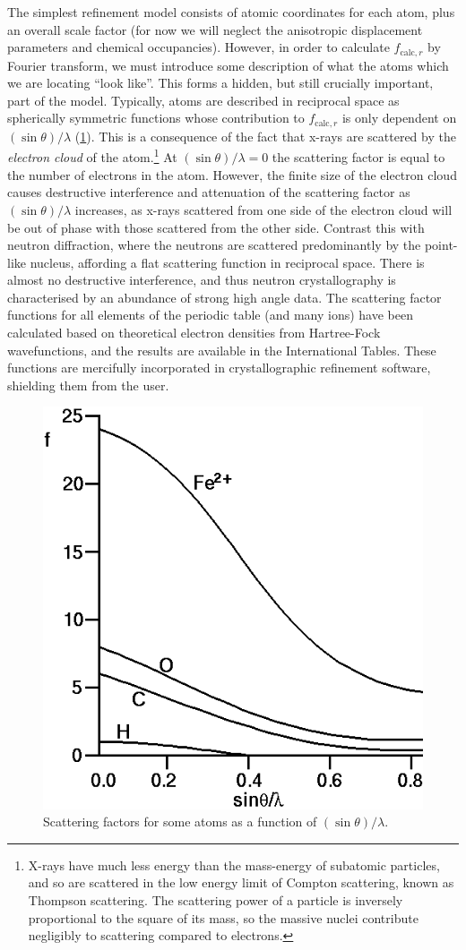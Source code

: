 \begin{refsection}
The simplest refinement model consists of atomic coordinates for each atom, plus an overall scale factor (for now we will neglect the anisotropic displacement parameters and chemical occupancies).
However, in order to calculate $f_{\mathrm{calc}, r}$ by Fourier transform, we must introduce some description of what the atoms which we are locating ``look like''.
This forms a hidden, but still crucially important, part of the model.
Typically, atoms are described in reciprocal space as spherically symmetric functions whose contribution to $f_{\mathrm{calc}, r}$ is only dependent on $(\sin\theta)/\lambda$ (\cref{fig:scatterf}).
This is a consequence of the fact that x-rays are scattered by the \emph{electron cloud} of the atom.\footnote{X-rays have much less energy than the mass-energy of subatomic particles, and so are scattered in the low energy limit of Compton scattering, known as Thompson scattering.
The scattering power of a particle is inversely proportional to the square of its mass, so the massive nuclei contribute negligibly to scattering compared to electrons.}
At $(\sin\theta)/\lambda = 0$ the scattering factor is equal to the number of electrons in the atom.
However, the finite size of the electron cloud causes destructive interference and attenuation of the scattering factor as $(\sin\theta)/\lambda$ increases, as x-rays scattered from one side of the electron cloud will be out of phase with those scattered from the other side.
Contrast this with neutron diffraction, where the neutrons are scattered predominantly by the point-like nucleus, affording a flat scattering function in reciprocal space.
There is almost no destructive interference, and thus neutron crystallography is characterised by an abundance of strong high angle data.
The scattering factor functions for all elements of the periodic table (and many ions) have been calculated based on theoretical electron densities from Hartree-Fock wavefunctions, and the results are available in the International Tables.\autocite{IntTabCIntensityofdiffractedintensities}
These functions are mercifully incorporated in crystallographic refinement software, shielding them from the user.

\begin{figure}
    \centering
    \includegraphics[width=0.5\linewidth]{Figures/scatterf.png}
    \caption{Scattering factors for some atoms as a function of $(\sin\theta)/\lambda$.}
    \label{fig:scatterf}
\end{figure}


\end{refsection}
